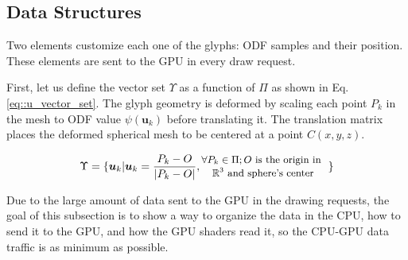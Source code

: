 \documentclass[twoside,twocolumn,10pt]{article}
\begin{document}


\subsection{Data Structures}
\label{ssec::datastruct}

Two elements customize each one of the glyphs: ODF samples and their position. These elements are sent to the GPU in every draw request.

First, let us define the vector set $\Upsilon$ as a function of $\Pi$ as shown in Eq. \ref{eq::u_vector_set}. The glyph geometry is deformed by scaling each point $P_k$ in the mesh to ODF value $\psi(\bm{u}_k)$ before translating it. The translation matrix places the deformed spherical mesh to be centered at a point $C(x, y, z)$.

\begin{equation}
\label{eq::u_vector_set}
\Upsilon = \{\bm{u}_k | \bm{u}_k = \frac{P_k - O}{|P_k - O|}, 
\begin{tabular}{@{}c@{}}
\small{$\forall P_k \in \Pi; O$ is the origin in } \\
\small{$\mathbb{R}^3$ and sphere's center}



\end{tabular}
\text{ }\}
\end{equation}


Due to the large amount of data sent to the GPU in the drawing requests, the goal of this subsection is to show a way to organize the data in the CPU, how to send it to the GPU, and how the GPU shaders read it, so the CPU-GPU data traffic is as minimum as possible. %



\end{document}
